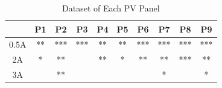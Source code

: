 \documentclass[conference]{IEEEtran}
\begin{document}

\begin{table}[htbp]
\caption{Dataset of Each PV Panel}
\begin{center}
\begin{tabular}{c|c|c|c|c|c|c|c|c|c}
     & P1 & P2  & P3  & P4 & P5 & P6  & P7  & P8  & P9  \\ \hline
0.5A & ** & *** & *** & ** & ** & *** & *** & *** & *** \\ \hline
2A   & *  & **  &     & ** & *  & **  & **  & *** & **  \\ \hline
3A   &    & **  &     &    &    &     & *   &     & *  
\end{tabular}
\label{tab1}
\end{center}
\end{table}
\end{document}
